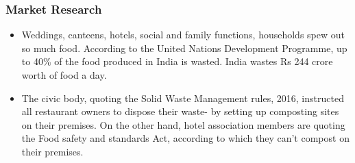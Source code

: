 \documentclass[11pt]{beamer}
\begin{document}
\begin{frame}
\frametitle{Market Research}
\begin{itemize}
	\item Weddings, canteens, hotels, social and family functions, households spew out so much food. According to the United Nations Development Programme, up to 40\% of the food produced in India is wasted. 
	India wastes Rs 244 crore worth of food a day.
	\item The civic body, quoting the Solid Waste Management rules, 2016, instructed all restaurant owners to dispose their waste- by setting up composting sites on their premises. On the other hand, hotel association members are quoting the Food safety and standards Act, according to which they can’t compost on their premises.
\end{itemize}	
\end{frame}
\end{document}
